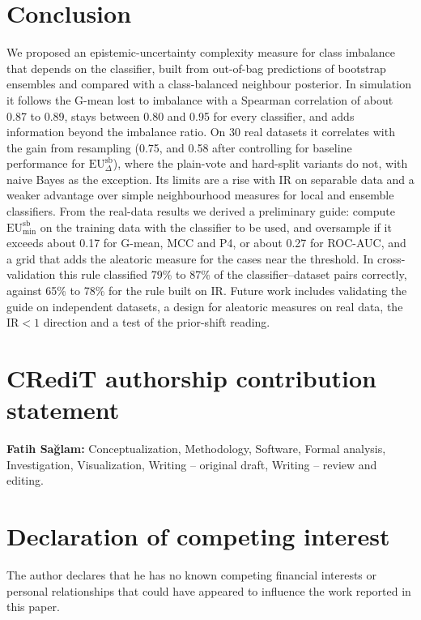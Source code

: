 \documentclass[preprint,12pt]{elsarticle}
\newcommand{\EUmin}[1]{\mathrm{EU}^{\mathrm{#1}}_{\min}}
\newcommand{\EUdif}[1]{\mathrm{EU}^{\mathrm{#1}}_{\Delta}}
\newcommand{\IR}{\mathrm{IR}}
\begin{document}
\section{Conclusion}\label{sec:concl}
We proposed an epistemic-uncertainty complexity measure for class imbalance that depends on the classifier, built from out-of-bag predictions of bootstrap ensembles and compared with a class-balanced neighbour posterior. In simulation it follows the G-mean lost to imbalance with a Spearman correlation of about 0.87 to 0.89, stays between 0.80 and 0.95 for every classifier, and adds information beyond the imbalance ratio. On 30 real datasets it correlates with the gain from resampling (0.75, and 0.58 after controlling for baseline performance for $\EUdif{sb}$), where the plain-vote and hard-split variants do not, with naive Bayes as the exception. Its limits are a rise with $\IR$ on separable data and a weaker advantage over simple neighbourhood measures for local and ensemble classifiers. From the real-data results we derived a preliminary guide: compute $\EUmin{sb}$ on the training data with the classifier to be used, and oversample if it exceeds about 0.17 for G-mean, MCC and P4, or about 0.27 for ROC-AUC, and a grid that adds the aleatoric measure for the cases near the threshold. In cross-validation this rule classified 79\% to 87\% of the classifier--dataset pairs correctly, against 65\% to 78\% for the rule built on $\IR$. Future work includes validating the guide on independent datasets, a design for aleatoric measures on real data, the $\IR<1$ direction and a test of the prior-shift reading.

\section*{CRediT authorship contribution statement}
\textbf{Fatih Sa\u{g}lam:} Conceptualization, Methodology, Software, Formal analysis, Investigation, Visualization, Writing -- original draft, Writing -- review and editing.

\section*{Declaration of competing interest}
The author declares that he has no known competing financial interests or personal relationships that could have appeared to influence the work reported in this paper.
\end{document}
